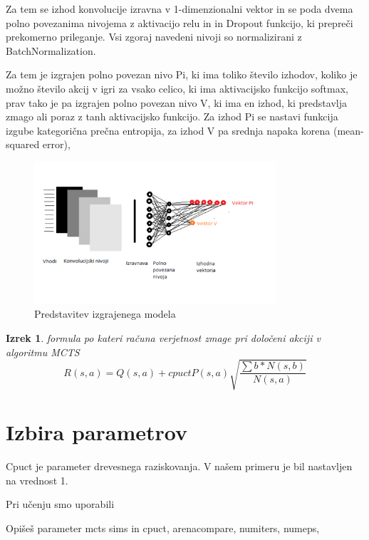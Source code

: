 \documentclass[a4paper, 12pt]{book}
\newtheorem{izrek}{Izrek}[chapter]
\begin{document}
Za tem se izhod konvolucije izravna v 1-dimenzionalni vektor in se poda dvema polno povezanima nivojema z aktivacijo relu in in Dropout funkcijo, ki prepreči prekomerno prileganje.
Vsi zgoraj navedeni nivoji so normalizirani z BatchNormalization.

Za tem je izgrajen polno povezan nivo Pi, ki ima toliko število izhodov, koliko je možno število akcij v igri za vsako celico, ki ima aktivacijsko funkcijo softmax,
prav tako je pa izgrajen polno povezan nivo V, ki ima en izhod, ki predstavlja zmago ali poraz z tanh aktivacijsko funkcijo.
Za izhod Pi se nastavi funkcija izgube kategorična prečna entropija, za izhod V pa srednja napaka korena (mean-squared error),


\begin{figure}[h]
	\begin{center}
		\includegraphics[width=0.8\textwidth]{vizualzacijaModela.pdf}
	\end{center}
	\caption{Predstavitev izgrajenega modela}
	\label{vizualzacijaModela}
\end{figure}

\begin{izrek}
	\label{iz:1}
	formula po kateri računa verjetnost zmage pri določeni akciji v algoritmu MCTS
	\begin{equation}
	R(s,a) = Q(s,a) + cpuctP(s, a)\sqrt{\dfrac{\sum{b}*N(s,b)}{N(s,a)}}
	\label{eq:mctsFormula}
	\end{equation}
\end{izrek}

\section{Izbira parametrov}
Cpuct je parameter drevesnega raziskovanja. V našem primeru je bil nastavljen na vrednost 1.

Pri učenju smo uporabili 

Opišeš parameter mcts sims in cpuct, arenacompare, numiters, numeps, 
\end{document}
